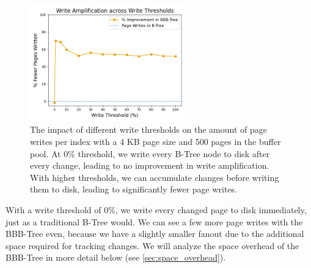 \begin{figure}[htbp]
  \centering
  \includegraphics[width=0.6\textwidth]{figures/evaluation/pageviews_write_thresholds_improvement.png}
  \caption{The impact of different write thresholds on the amount of page writes per index with a 4 KB page size and 500 pages in the buffer pool. At 0\% threshold, we write every B-Tree node to disk after every change, leading to no improvement in write amplification. With higher thresholds, we can accumulate changes before writing them to disk, leading to significantly fewer page writes.}
  \label{fig:write_thresholds_improvement}
\end{figure}

With a write threshold of 0\%, we write every changed page to disk immediately, just as a traditional B-Tree would.
We can see a few more page writes with the BBB-Tree even, because we have a slightly smaller fanout due to the additional space required for tracking changes.
We will analyze the space overhead of the BBB-Tree in more detail below (see \autoref{sec:space_overhead}).

